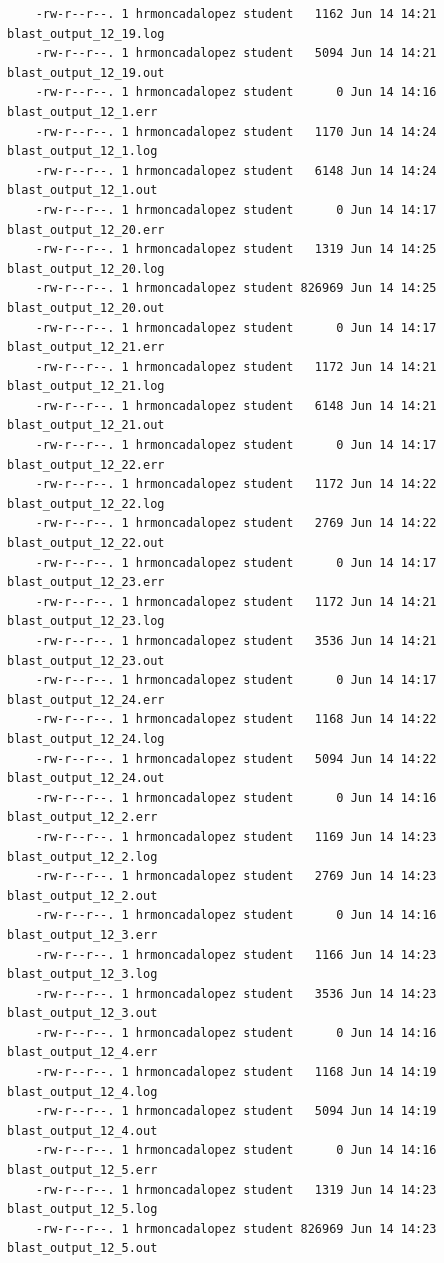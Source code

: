 \documentclass{article}
\begin{document}
\begin{itemize}
\begin{verbatim}
    -rw-r--r--. 1 hrmoncadalopez student   1162 Jun 14 14:21 blast_output_12_19.log
    -rw-r--r--. 1 hrmoncadalopez student   5094 Jun 14 14:21 blast_output_12_19.out
    -rw-r--r--. 1 hrmoncadalopez student      0 Jun 14 14:16 blast_output_12_1.err
    -rw-r--r--. 1 hrmoncadalopez student   1170 Jun 14 14:24 blast_output_12_1.log
    -rw-r--r--. 1 hrmoncadalopez student   6148 Jun 14 14:24 blast_output_12_1.out
    -rw-r--r--. 1 hrmoncadalopez student      0 Jun 14 14:17 blast_output_12_20.err
    -rw-r--r--. 1 hrmoncadalopez student   1319 Jun 14 14:25 blast_output_12_20.log
    -rw-r--r--. 1 hrmoncadalopez student 826969 Jun 14 14:25 blast_output_12_20.out
    -rw-r--r--. 1 hrmoncadalopez student      0 Jun 14 14:17 blast_output_12_21.err
    -rw-r--r--. 1 hrmoncadalopez student   1172 Jun 14 14:21 blast_output_12_21.log
    -rw-r--r--. 1 hrmoncadalopez student   6148 Jun 14 14:21 blast_output_12_21.out
    -rw-r--r--. 1 hrmoncadalopez student      0 Jun 14 14:17 blast_output_12_22.err
    -rw-r--r--. 1 hrmoncadalopez student   1172 Jun 14 14:22 blast_output_12_22.log
    -rw-r--r--. 1 hrmoncadalopez student   2769 Jun 14 14:22 blast_output_12_22.out
    -rw-r--r--. 1 hrmoncadalopez student      0 Jun 14 14:17 blast_output_12_23.err
    -rw-r--r--. 1 hrmoncadalopez student   1172 Jun 14 14:21 blast_output_12_23.log
    -rw-r--r--. 1 hrmoncadalopez student   3536 Jun 14 14:21 blast_output_12_23.out
    -rw-r--r--. 1 hrmoncadalopez student      0 Jun 14 14:17 blast_output_12_24.err
    -rw-r--r--. 1 hrmoncadalopez student   1168 Jun 14 14:22 blast_output_12_24.log
    -rw-r--r--. 1 hrmoncadalopez student   5094 Jun 14 14:22 blast_output_12_24.out
    -rw-r--r--. 1 hrmoncadalopez student      0 Jun 14 14:16 blast_output_12_2.err
    -rw-r--r--. 1 hrmoncadalopez student   1169 Jun 14 14:23 blast_output_12_2.log
    -rw-r--r--. 1 hrmoncadalopez student   2769 Jun 14 14:23 blast_output_12_2.out
    -rw-r--r--. 1 hrmoncadalopez student      0 Jun 14 14:16 blast_output_12_3.err
    -rw-r--r--. 1 hrmoncadalopez student   1166 Jun 14 14:23 blast_output_12_3.log
    -rw-r--r--. 1 hrmoncadalopez student   3536 Jun 14 14:23 blast_output_12_3.out
    -rw-r--r--. 1 hrmoncadalopez student      0 Jun 14 14:16 blast_output_12_4.err
    -rw-r--r--. 1 hrmoncadalopez student   1168 Jun 14 14:19 blast_output_12_4.log
    -rw-r--r--. 1 hrmoncadalopez student   5094 Jun 14 14:19 blast_output_12_4.out
    -rw-r--r--. 1 hrmoncadalopez student      0 Jun 14 14:16 blast_output_12_5.err
    -rw-r--r--. 1 hrmoncadalopez student   1319 Jun 14 14:23 blast_output_12_5.log
    -rw-r--r--. 1 hrmoncadalopez student 826969 Jun 14 14:23 blast_output_12_5.out

\end{verbatim}
\end{itemize}
\end{document}
